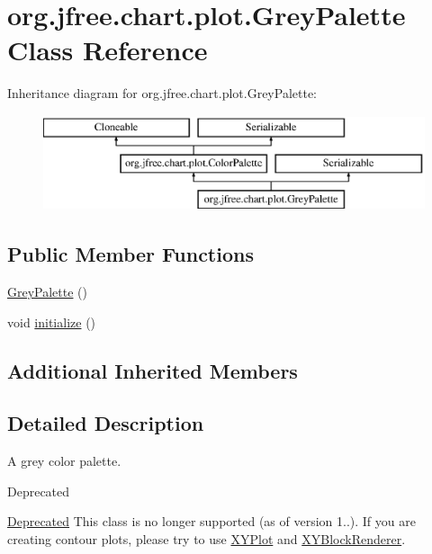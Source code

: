 \hypertarget{classorg_1_1jfree_1_1chart_1_1plot_1_1_grey_palette}{}\section{org.\+jfree.\+chart.\+plot.\+Grey\+Palette Class Reference}
\label{classorg_1_1jfree_1_1chart_1_1plot_1_1_grey_palette}
Inheritance diagram for org.\+jfree.\+chart.\+plot.\+Grey\+Palette\+:\begin{figure}[H]
\begin{center}
\leavevmode
\includegraphics[height=2.814070cm]{classorg_1_1jfree_1_1chart_1_1plot_1_1_grey_palette}
\end{center}
\end{figure}
\subsection*{Public Member Functions}
\begin{DoxyCompactItemize}
\item 
\mbox{\hyperlink{classorg_1_1jfree_1_1chart_1_1plot_1_1_grey_palette_a7afd76f546dd7bbfce3d4196988a7270}{Grey\+Palette}} ()
\item 
void \mbox{\hyperlink{classorg_1_1jfree_1_1chart_1_1plot_1_1_grey_palette_a302469ee674b8824a36b6bb6e44d6909}{initialize}} ()
\end{DoxyCompactItemize}
\subsection*{Additional Inherited Members}


\subsection{Detailed Description}
A grey color palette.

\begin{DoxyRefDesc}{Deprecated}
\item[\mbox{\hyperlink{deprecated__deprecated000062}{Deprecated}}]This class is no longer supported (as of version 1..). If you are creating contour plots, please try to use \mbox{\hyperlink{classorg_1_1jfree_1_1chart_1_1plot_1_1_x_y_plot}{X\+Y\+Plot}} and \mbox{\hyperlink{}{X\+Y\+Block\+Renderer}}. \end{DoxyRefDesc}


